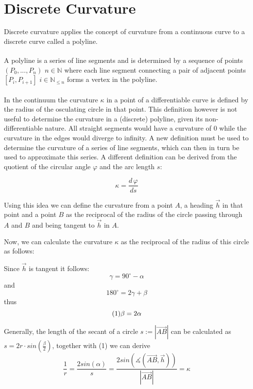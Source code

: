 \section{Discrete Curvature}


Discrete curvature applies the concept of curvature from a continuous curve to a discrete curve called a polyline.\\
\\

A polyline is a series of line segments and is determined by a sequence of points $(P_0,...,P_n)$ $n \in \mathbb{N}$ where each line segment connecting a pair of adjacent points $[P_i,P_{i+1}]$ $i \in \mathbb{N}_{\le n}$ forms a vertex in the polyline.\\
\\In the continuum the curvature $\kappa$ in a point of a differentiable curve is defined by the radius of the osculating circle in that point. This definition however is not useful to determine the curvature in a (discrete) polyline, given its non-differentiable nature. All straight segments would have a curvature of $0$ while the curvature in the edges would diverge to infinity. A new definition must be used to determine the curvature of a series of line segments, which can then in turn be used to approximate this series. A different definition can be derived from the quotient of the circular angle $\varphi$ and the arc length $s$:

$$\kappa  =  {\frac{{d\,\varphi}}{{ds}}}$$

Using this idea we can define the curvature from a point $A$, a heading  $\vec h$ in that point and a point $B$ as the reciprocal of the radius of the circle passing through $A$ and $B$ and being tangent to  $\vec h$ in $A$.


Now, we can calculate the curvature $\kappa$ as the reciprocal of the radius of this circle as follows:

Since $\vec h$ is tangent it follows: $$\gamma=90^{\circ} - \alpha$$ and $$180^{\circ}=2\gamma+\beta$$ thus $$(1) \space \beta = 2 \alpha$$


Generally, the length of the secant of a circle $s:=|\vec{AB}|$ can be calculated as
$s = 2r \cdot  sin(\frac{\beta}{2})$, together with (1) we can derive
$$\frac{1}{r} = \frac{2sin(\alpha)}{s} = \frac{2sin(\measuredangle(\vec{AB},\vec h))}{|\vec{AB}|} = \kappa$$\\

